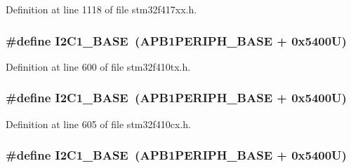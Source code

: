 Definition at line 1118 of file stm32f417xx.\+h.

\subsubsection[{\texorpdfstring{I2\+C1\+\_\+\+B\+A\+SE}{I2C1_BASE}}]{\setlength{\rightskip}{0pt plus 5cm}\#define I2\+C1\+\_\+\+B\+A\+SE~({\bf A\+P\+B1\+P\+E\+R\+I\+P\+H\+\_\+\+B\+A\+SE} + 0x5400\+U)}\hypertarget{group___peripheral__registers__structures_gacd72dbffb1738ca87c838545c4eb85a3}{}\label{group___peripheral__registers__structures_gacd72dbffb1738ca87c838545c4eb85a3}


Definition at line 600 of file stm32f410tx.\+h.

\subsubsection[{\texorpdfstring{I2\+C1\+\_\+\+B\+A\+SE}{I2C1_BASE}}]{\setlength{\rightskip}{0pt plus 5cm}\#define I2\+C1\+\_\+\+B\+A\+SE~({\bf A\+P\+B1\+P\+E\+R\+I\+P\+H\+\_\+\+B\+A\+SE} + 0x5400\+U)}\hypertarget{group___peripheral__registers__structures_gacd72dbffb1738ca87c838545c4eb85a3}{}\label{group___peripheral__registers__structures_gacd72dbffb1738ca87c838545c4eb85a3}


Definition at line 605 of file stm32f410cx.\+h.

\subsubsection[{\texorpdfstring{I2\+C1\+\_\+\+B\+A\+SE}{I2C1_BASE}}]{\setlength{\rightskip}{0pt plus 5cm}\#define I2\+C1\+\_\+\+B\+A\+SE~({\bf A\+P\+B1\+P\+E\+R\+I\+P\+H\+\_\+\+B\+A\+SE} + 0x5400\+U)}\hypertarget{group___peripheral__registers__structures_gacd72dbffb1738ca87c838545c4eb85a3}{}\label{group___peripheral__registers__structures_gacd72dbffb1738ca87c838545c4eb85a3}


